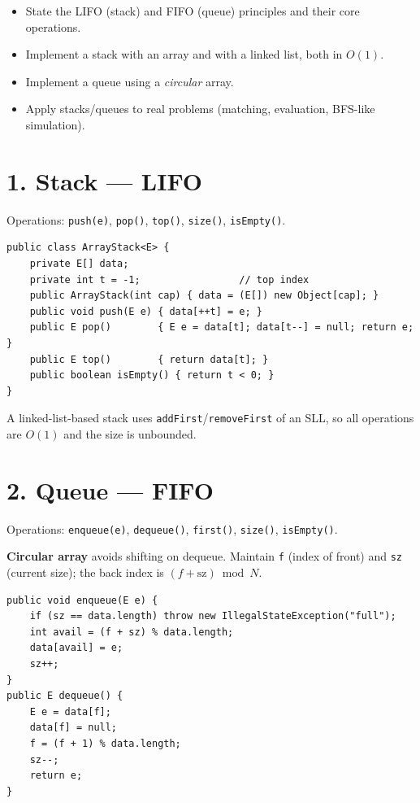 \documentclass[11pt]{article}
\begin{document}

\begin{objbox}
\begin{itemize}[leftmargin=*]
  \item State the LIFO (stack) and FIFO (queue) principles and their core operations.
  \item Implement a stack with an array and with a linked list, both in $O(1)$.
  \item Implement a queue using a \emph{circular} array.
  \item Apply stacks/queues to real problems (matching, evaluation, BFS-like simulation).
\end{itemize}
\end{objbox}

\section*{1. Stack --- LIFO}

Operations: \texttt{push(e)}, \texttt{pop()}, \texttt{top()}, \texttt{size()}, \texttt{isEmpty()}.

\begin{lstlisting}
public class ArrayStack<E> {
    private E[] data;
    private int t = -1;                 // top index
    public ArrayStack(int cap) { data = (E[]) new Object[cap]; }
    public void push(E e) { data[++t] = e; }
    public E pop()        { E e = data[t]; data[t--] = null; return e; }
    public E top()        { return data[t]; }
    public boolean isEmpty() { return t < 0; }
}
\end{lstlisting}

A linked-list-based stack uses \texttt{addFirst}/\texttt{removeFirst} of an SLL, so all operations are $O(1)$ and the size is unbounded.

\section*{2. Queue --- FIFO}

Operations: \texttt{enqueue(e)}, \texttt{dequeue()}, \texttt{first()}, \texttt{size()}, \texttt{isEmpty()}.

\textbf{Circular array} avoids shifting on dequeue. Maintain \texttt{f} (index of front) and \texttt{sz} (current size); the back index is $(f+\text{sz}) \bmod N$.

\begin{lstlisting}
public void enqueue(E e) {
    if (sz == data.length) throw new IllegalStateException("full");
    int avail = (f + sz) % data.length;
    data[avail] = e;
    sz++;
}
public E dequeue() {
    E e = data[f];
    data[f] = null;
    f = (f + 1) % data.length;
    sz--;
    return e;
}
\end{lstlisting}
\end{document}

